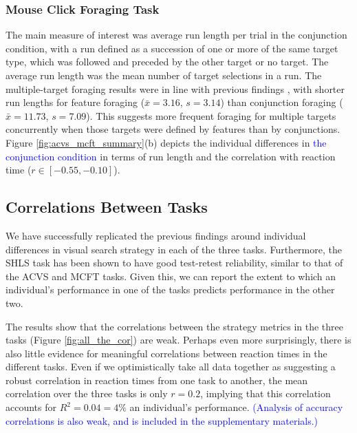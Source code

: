 \documentclass[Afour, sageapa, times]{sagej}
\begin{document}
\subsubsection{Mouse Click Foraging Task}
 
The main measure of interest was average run length per trial in the conjunction condition, with a run defined as a succession of one or more of the same target type, which was followed and preceded by the other target or no target. The average run length was the mean number of target selections in a run. The multiple-target foraging results were in line with previous findings  \cite{kristjansson2014,johannesson2016}, with shorter run lengths for feature foraging ($\bar{x} = 3.16$, $s = 3.14$) than conjunction foraging ($\bar{x} = 11.73$, $s = 7.09$). This suggests more frequent foraging for multiple targets concurrently when those targets were defined by features than by conjunctions. Figure \ref{fig:acvs_mcft_summary}(b) depicts the individual differences in \textcolor{blue}{the conjunction condition} in terms of run length and the correlation with reaction time ($r \in [-0.55, -0.10]$).

\subsection{Correlations Between Tasks}

We have successfully replicated the previous findings around individual differences in visual search strategy in each of the three tasks. Furthermore, the SHLS task has been shown to have good test-retest reliability, similar to that of the ACVS  and MCFT tasks. Given this, we can report the extent to which an individual's performance in one of the tasks predicts performance in the other two. 

The results show that the correlations between the strategy metrics in the three tasks (Figure \ref{fig:all_the_cor}) are weak. Perhaps even more surprisingly, there is also little evidence for meaningful correlations between reaction times in the different tasks. Even if we optimistically take all data together as suggesting a robust correlation in reaction times from one task to another, the mean correlation over the three tasks is only $r = 0.2$, implying that this correlation accounts for  $R^2 = 0.04 = 4\%$ an individual's performance. \textcolor{blue}{(Analysis of accuracy correlations is also weak, and is included in the supplementary materials.)}
\end{document}
